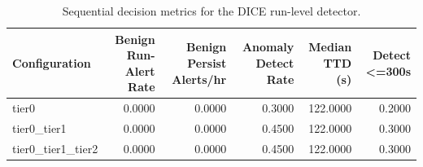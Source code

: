 \begin{table}[t]
\centering
\caption{Sequential decision metrics for the DICE run-level detector.}
\label{tab:dice_sequential_metrics}
\footnotesize
\begin{tabular}{lrrrrr}
\toprule
Configuration & Benign Run-Alert Rate & Benign Persist Alerts/hr & Anomaly Detect Rate & Median TTD (s) & Detect <=300s \\
\midrule
tier0 & 0.0000 & 0.0000 & 0.3000 & 122.0000 & 0.2000 \\
tier0_tier1 & 0.0000 & 0.0000 & 0.4500 & 122.0000 & 0.3000 \\
tier0_tier1_tier2 & 0.0000 & 0.0000 & 0.4500 & 122.0000 & 0.3000 \\
\bottomrule
\end{tabular}

\end{table}
